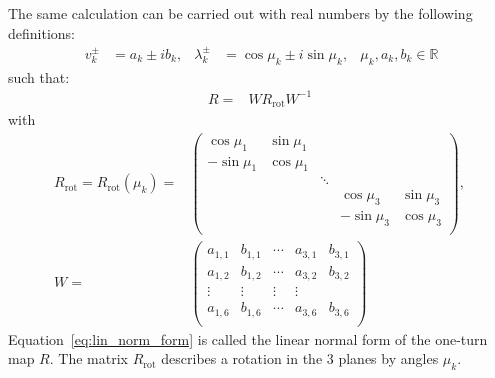 The same calculation can be carried out with real numbers by the following definitions:
\begin{align}\
v_k^\pm &= a_k\pm ib_k, & \lambda_k^\pm &= \cos \mu_k \pm i \sin \mu_k, &
\mu_k, a_k, b_k \in \mathbb{R}
\end{align}
such that:
\begin{align}\label{eq:lin_norm_form}
R=&W R_{\mathrm{rot}} W^{-1}
\end{align}
with
\begin{align}
R_{\mathrm{rot}}=R_{\mathrm{rot}}(\mu_k)=&\left(
\begin{array}{ccccc}
\cos \mu_1 & \sin \mu_1  &  & &\\
-\sin \mu_1 & \cos \mu_1 &  & &\\
&    & \ddots & &\\
& & & \cos \mu_3 & \sin \mu_3 \\
& & & -\sin \mu_3 & \cos \mu_3 \\
\end{array}
\right), \\
W=&\left(
\begin{array}{ccccc}
a_{1,1} & b_{1,1} & \cdots & a_{3,1} & b_{3,1} \\
a_{1,2} & b_{1,2} & \cdots & a_{3,2} & b_{3,2} \\
\vdots    & \vdots    & \vdots & \vdots\\
a_{1,6} & b_{1,6} & \cdots & a_{3,6} & b_{3,6} \\
\end{array}
\right)
\end{align}
Equation~\ref{eq:lin_norm_form} is called the linear normal form of the one-turn map $R$.
The matrix $R_{\mathrm{rot}}$ describes a rotation in the 3 planes by angles $\mu_k$.

